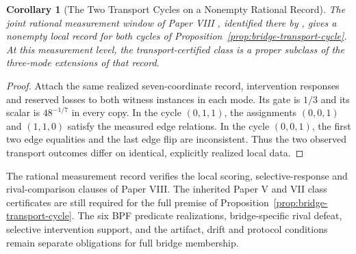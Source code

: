 \documentclass[11pt,a4paper]{article}
\newtheorem{corollary}[theorem]{Corollary}
\theoremstyle{definition}
\begin{document}
\begin{corollary}[The Two Transport Cycles on a Nonempty Rational Record]\label{cor:transport-rational-record}
The joint rational measurement window of Paper VIII \cite{paper8}, identified there by \texttt{\allowbreak{}\allowbreak{}\allowbreak{}}, gives a nonempty local record for both cycles of Proposition~\ref{prop:bridge-transport-cycle}. At this measurement level, the transport-certified class is a proper subclass of the three-mode extensions of that record.
\end{corollary}
\begin{proof}
Attach the same realized seven-coordinate record, intervention responses and reserved losses to both witness instances in each mode. Its gate is $1/3$ and its scalar is $48^{-1/7}$ in every copy. In the cycle $(0,1,1)$, the assignments $(0,0,1)$ and $(1,1,0)$ satisfy the measured edge relations. In the cycle $(0,0,1)$, the first two edge equalities and the last edge flip are inconsistent. Thus the two observed transport outcomes differ on identical, explicitly realized local data.
\end{proof}

The rational measurement record verifies the local scoring, selective-response and rival-comparison clauses of Paper VIII. The inherited Paper V and VII class certificates are still required for the full premise of Proposition~\ref{prop:bridge-transport-cycle}. The six BPF predicate realizations, bridge-specific rival defeat, selective intervention support, and the artifact, drift and protocol conditions remain separate obligations for full bridge membership.
\end{document}
